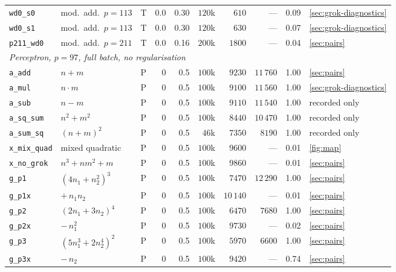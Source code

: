 \documentclass{article}
\begin{document}
\begin{table}[H]
\begin{tabular}{lllrrrrrrl}
\texttt{wd0\_s0}       & mod.\ add.\ $p{=}113$ & T & 0.0 & 0.30 & $120$k & $610$    & ---        & 0.09 & \cref{sec:grok-diagnostics} \\
\texttt{wd0\_s1}       & mod.\ add.\ $p{=}113$ & T & 0.0 & 0.30 & $120$k & $630$    & ---        & 0.07 & \cref{sec:grok-diagnostics} \\
\texttt{p211\_wd0}     & mod.\ add.\ $p{=}211$ & T & 0.0 & 0.16 & $200$k & $1800$ & ---        & 0.04 & \cref{sec:pairs} \\
\midrule
\multicolumn{10}{l}{\emph{Perceptron, $p = 97$, full batch, no regularisation}} \\
\texttt{a\_add}     & $n+m$                        & P & 0 & 0.5 & $100$k & $9230$  & $11\,760$ & 1.00 & \cref{sec:pairs} \\
\texttt{a\_mul}     & $n \cdot m$                  & P & 0 & 0.5 & $100$k & $9100$  & $11\,560$ & 1.00 & \cref{sec:grok-diagnostics} \\
\texttt{a\_sub}     & $n-m$                        & P & 0 & 0.5 & $100$k & $9110$  & $11\,540$ & 1.00 & recorded only \\
\texttt{a\_sq\_sum}  & $n^2+m^2$                    & P & 0 & 0.5 & $100$k & $8440$  & $10\,470$ & 1.00 & recorded only \\
\texttt{a\_sum\_sq}  & $(n+m)^2$                    & P & 0 & 0.5 & $46$k  & $7350$  & $8190$  & 1.00 & recorded only \\
\texttt{x\_mix\_quad} & mixed quadratic              & P & 0 & 0.5 & $100$k & $9600$  & ---       & 0.01 & \cref{fig:map} \\
\texttt{x\_no\_grok} & $n^3+nm^2+m$                 & P & 0 & 0.5 & $100$k & $9860$  & ---       & 0.01 & \cref{sec:pairs} \\
\texttt{g\_p1}      & $(4n_1+n_2^2)^3$             & P & 0 & 0.5 & $100$k & $7470$  & $12\,290$ & 1.00 & \cref{sec:pairs} \\
\texttt{g\_p1x}     & \quad $+\, n_1 n_2$          & P & 0 & 0.5 & $100$k & $10\,140$ & ---       & 0.01 & \cref{sec:pairs} \\
\texttt{g\_p2}      & $(2n_1+3n_2)^4$              & P & 0 & 0.5 & $100$k & $6470$  & $7680$  & 1.00 & \cref{sec:pairs} \\
\texttt{g\_p2x}     & \quad $-\, n_1^2$            & P & 0 & 0.5 & $100$k & $9730$  & ---       & 0.02 & \cref{sec:pairs} \\
\texttt{g\_p3}      & $(5n_1^3+2n_2^4)^2$          & P & 0 & 0.5 & $100$k & $5970$  & $6600$  & 1.00 & \cref{sec:pairs} \\
\texttt{g\_p3x}     & \quad $-\, n_2$              & P & 0 & 0.5 & $100$k & $9420$  & ---       & 0.74 & \cref{sec:pairs} \\
\bottomrule
\end{tabular}
\end{table}
\end{document}
